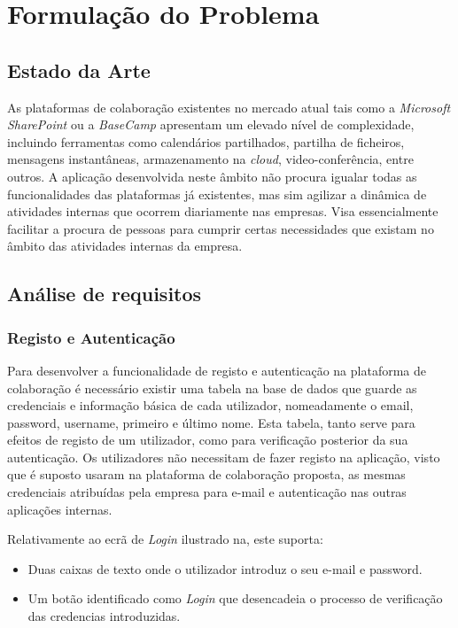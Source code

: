 \chapter{Formulação do Problema}\label{chapter:formulacaoDoProblema}

\section{Estado da Arte}\label{sec:estadoDaArte}
As plataformas de colaboração existentes no mercado atual tais como a \textit{Microsoft SharePoint} ou a \textit{BaseCamp} apresentam um elevado nível de complexidade, incluindo ferramentas como calendários partilhados, partilha de ficheiros, mensagens instantâneas, armazenamento na \textit{cloud}, video-conferência, entre outros. A aplicação desenvolvida neste âmbito não procura igualar todas as funcionalidades das plataformas já existentes, mas sim agilizar a dinâmica de atividades internas que ocorrem diariamente nas empresas. Visa essencialmente facilitar a procura de pessoas para cumprir certas necessidades que existam no âmbito das atividades internas da empresa.

\section{Análise de requisitos}\label{sec:requisitos}

\subsection{Registo e Autenticação}\label{subsec:login}
Para desenvolver a funcionalidade de registo e autenticação na plataforma de colaboração é necessário existir uma tabela 
na base de dados que guarde as credenciais e informação básica de cada utilizador, nomeadamente 
o email, password, username, primeiro e último nome. 
Esta tabela, tanto serve para efeitos de registo de um utilizador, como para verificação posterior da sua autenticação. 
Os utilizadores não necessitam de fazer registo na aplicação, visto que é suposto usaram na plataforma de colaboração proposta, 
as mesmas credenciais atribuídas pela empresa para e-mail e autenticação nas outras aplicações internas.

Relativamente ao ecrã de \textit{Login} ilustrado na, este suporta:

\begin{itemize}
    \item Duas caixas de texto onde o utilizador introduz o seu e-mail e password.
    \item Um botão identificado como \textit{Login} que desencadeia o processo de verificação das credencias introduzidas.
\end{itemize}

